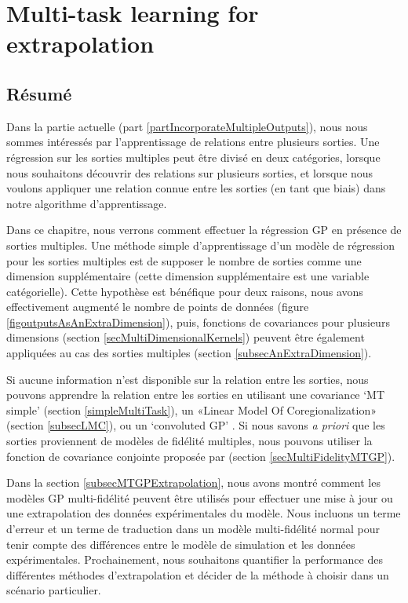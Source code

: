 \chapter{Multi-task learning for extrapolation}
\label{chapMultiTaskExtrapolation}

\begin{mdframed}[hidealllines=true,backgroundcolor=lightgray!20]
\section*{Résumé}
Dans la partie actuelle (part \ref{partIncorporateMultipleOutputs}), nous nous sommes intéressés par l'apprentissage de relations entre plusieurs sorties. Une régression sur les sorties multiples peut être divisé en deux catégories, lorsque nous souhaitons découvrir des relations sur plusieurs sorties, et lorsque nous voulons appliquer une relation connue entre les sorties (en tant que biais) dans notre algorithme d'apprentissage.

Dans ce chapitre, nous verrons comment effectuer la régression GP en présence de sorties multiples. Une méthode simple d'apprentissage d'un modèle de régression pour les sorties multiples est de supposer le nombre de sorties comme une dimension supplémentaire (cette dimension supplémentaire est une variable catégorielle). Cette hypothèse est bénéfique pour deux raisons, nous avons effectivement augmenté le nombre de points de données (figure \ref{figoutputsAsAnExtraDimension}), puis, fonctions de covariances pour plusieurs dimensions (section \ref{secMultiDimensionalKernels}) peuvent être également appliquées au cas des sorties multiples (section \ref{subsecAnExtraDimension}).

Si aucune information n'est disponible sur la relation entre les sorties, nous pouvons apprendre la relation entre les sorties en utilisant une covariance `MT simple’ (section \ref{simpleMultiTask}), un «Linear Model Of Coregionalization» (section \ref{subsecLMC}), ou un `convoluted GP’ \cite{alvarez2011kernels}. Si nous savons \textit{a priori} que les sorties proviennent de modèles de fidélité multiples, nous pouvons utiliser la fonction de covariance conjointe proposée par \cite{kennedy2000predicting} (section \ref{secMultiFidelityMTGP}).

Dans la section \ref{subsecMTGPExtrapolation}, nous avons montré comment les modèles GP multi-fidélité peuvent être utilisés pour effectuer une mise à jour ou une extrapolation des données expérimentales du modèle. Nous incluons un terme d'erreur et un terme de traduction dans un modèle multi-fidélité normal pour tenir compte des différences entre le modèle de simulation et les données expérimentales. Prochainement, nous souhaitons quantifier la performance des différentes méthodes d'extrapolation et décider de la méthode à choisir dans un scénario particulier.
\end{mdframed}


